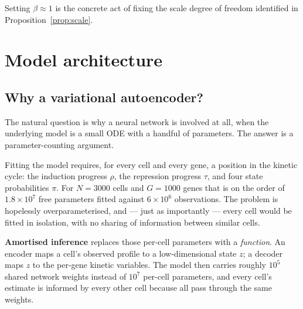 \documentclass[11pt,a4paper]{article}
\theoremstyle{definition}
\begin{document}
Setting $\beta \approx 1$ is the concrete act of fixing the scale degree of
freedom identified in Proposition~\ref{prop:scale}.

\section{Model architecture}
\label{sec:architecture}

\subsection{Why a variational autoencoder?}

The natural question is why a neural network is involved at all, when the
underlying model is a small ODE with a handful of parameters. The answer is a
parameter-counting argument.

Fitting the model requires, for every cell and every gene, a position in the
kinetic cycle: the induction progress $\rho$, the repression progress $\tau$,
and four state probabilities $\pi$. For $N = 3000$ cells and $G = 1000$ genes
that is on the order of $1.8 \times 10^7$ free parameters fitted against
$6 \times 10^6$ observations. The problem is hopelessly overparameterised, and
--- just as importantly --- every cell would be fitted in isolation, with no
sharing of information between similar cells.

\textbf{Amortised inference} replaces those per-cell parameters with a
\emph{function}. An encoder maps a cell's observed profile to a low-dimensional
state $z$; a decoder maps $z$ to the per-gene kinetic variables. The model then
carries roughly $10^5$ shared network weights instead of $10^7$ per-cell
parameters, and every cell's estimate is informed by every other cell because
all pass through the same weights.
\end{document}
